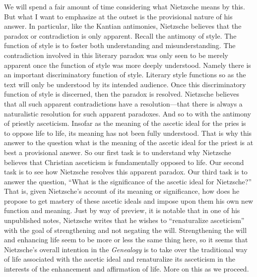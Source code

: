 We will spend a fair amount of time considering what Nietzsche means by this. But what I want to emphasize at the outset is the provisional nature of his answer. In particular, like the Kantian antimonies, Nietzsche believes that the paradox or contradiction is only apparent. Recall the antimony of style. The function of style is to foster both understanding and misunderstanding. The contradiction involved in this literary paradox was only seen to be merely apparent once the function of style was more deeply understood. Namely there is an important discriminatory function of style. Literary style functions so as the text will only be understood by its intended audience. Once this discriminatory function of style is discerned, then the paradox is resolved. Nietzsche believes that all such apparent contradictions have a resolution---that there is always a naturalistic resolution for such apparent paradoxes. And so to with the antimony of priestly asceticism. Insofar as the meaning of the ascetic ideal for the pries is to oppose life to life, its meaning has not been fully understood. That is why this answer to the question what is the meaning of the ascetic ideal for the priest is at best a provisional answer. So our first task is to understand why Nietzsche believes that Christian asceticism is fundamentally opposed to life. Our second task is to see how Nietzsche resolves this apparent paradox. Our third task is to answer the question, ``What is the significance of the ascetic ideal for Nietzsche?'' That is, given Nietzsche's account of its meaning or significance, how does he propose to get mastery of these ascetic ideals and impose upon them his own new function and meaning. Just by way of preview, it is notable that in one of his unpublished notes, Nietzsche writes that he wishes to ``renaturalize asceticism'' with the goal of strengthening and not negating the will. Strengthening the will and enhancing life seem to be more or less the same thing here, so it seems that Nietzsche's overall intention in the \emph{Genealogy} is to take over the traditional way of life associated with the ascetic ideal and renaturalize its asceticism in the interests of the enhancement and affirmation of life. More on this as we proceed. \change

